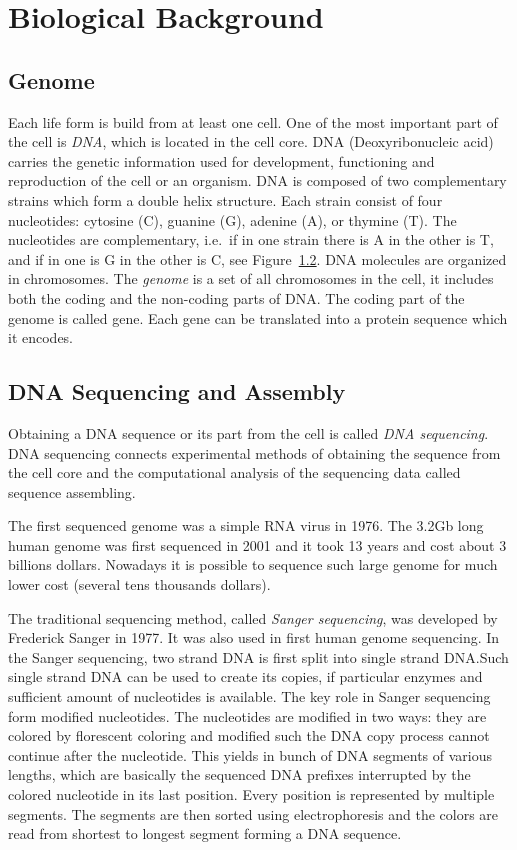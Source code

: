 \section{Biological Background}\label{SECTION:BIOINTRO}

\subsection{Genome}

Each life form is build from at least one cell. One of the most important part of the cell is \emph{DNA}, which is located in the cell core.
DNA (Deoxyribonucleic acid) carries the genetic information used for development, functioning and reproduction of the cell or an organism.
DNA is composed of two complementary strains which form a double helix structure. Each strain consist of four nucleotides: cytosine (C), guanine (G), adenine (A), or thymine (T).
The nucleotides are complementary, i.e.\ if in one strain there is A in the other is T, and if in one is G in the other is C, see Figure~\ref{}.
DNA molecules are organized in chromosomes.
The \emph{genome} is a set of all chromosomes in the cell, it includes both the coding and the non-coding parts of DNA.\@
The coding part of the genome is called gene. Each gene can be translated into a protein sequence which it encodes.

\subsection{DNA Sequencing and Assembly}

Obtaining a DNA sequence or its part from the cell is called \emph{DNA sequencing}.
DNA sequencing connects experimental methods of obtaining the sequence from the cell core and the computational analysis of the sequencing data called sequence assembling.

The first sequenced genome was a simple RNA virus in 1976. The 3.2Gb long human genome was first sequenced in 2001 and it took 13 years and cost about 3 billions dollars. Nowadays it is possible to sequence such large genome for much lower cost (several tens thousands dollars).

The traditional sequencing method, called \emph{Sanger sequencing}, was developed by Frederick Sanger in 1977\cite{sanger1977dna}. It was also used in first human genome sequencing.
In the Sanger sequencing, two strand DNA is first split into single strand DNA.\@ Such single strand DNA can be used to create its copies, if particular enzymes and sufficient amount of nucleotides is available. The key role in Sanger sequencing form modified nucleotides. The nucleotides are modified in two ways: they are colored by florescent coloring and modified such the DNA copy process cannot continue after the nucleotide. This yields in bunch of DNA segments of various lengths, which are basically the sequenced DNA prefixes interrupted by the colored nucleotide in its last position. Every position is represented by multiple segments. The segments are then sorted using electrophoresis and the colors are read from shortest to longest segment forming a DNA sequence.


